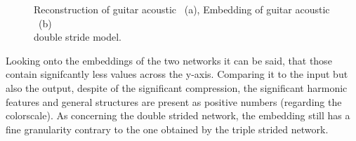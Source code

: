 \begin{figure}[htb!]
    \centering
    \captionsetup{justification=centering}
    \caption{Reconstruction of guitar acoustic ~(a), Embedding of guitar acoustic ~(b)\\double stride model.}
    \label{fig:res_double_str_2D_output_emb}
\end{figure}

Looking onto the embeddings of the two networks it can be said, that those contain signifcantly less values across the y-axis. Comparing it to the input but also the output, despite of the significant compression, the significant harmonic features and general structures are present as positive numbers (regarding the colorscale). As concerning the double strided network, the embedding still has a fine granularity contrary to the one obtained by the triple strided network.

